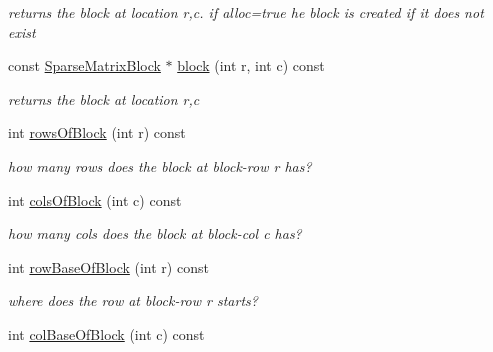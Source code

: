 \begin{DoxyCompactItemize}
\begin{DoxyCompactList}\small\item\em returns the block at location r,c. if alloc=true he block is created if it does not exist \end{DoxyCompactList}\item 
\hypertarget{classg2o_1_1SparseBlockMatrix_a1dd47246358ea852f8ff3db76aa6a287}{const \hyperlink{classg2o_1_1SparseBlockMatrix_ab2f7376cbf055803fda6527dcc43e3be}{Sparse\-Matrix\-Block} $\ast$ \hyperlink{classg2o_1_1SparseBlockMatrix_a1dd47246358ea852f8ff3db76aa6a287}{block} (int r, int c) const }\label{classg2o_1_1SparseBlockMatrix_a1dd47246358ea852f8ff3db76aa6a287}

\begin{DoxyCompactList}\small\item\em returns the block at location r,c \end{DoxyCompactList}\item 
\hypertarget{classg2o_1_1SparseBlockMatrix_a2f1eceae58978d7ee263a80961006d22}{int \hyperlink{classg2o_1_1SparseBlockMatrix_a2f1eceae58978d7ee263a80961006d22}{rows\-Of\-Block} (int r) const }\label{classg2o_1_1SparseBlockMatrix_a2f1eceae58978d7ee263a80961006d22}

\begin{DoxyCompactList}\small\item\em how many rows does the block at block-\/row r has? \end{DoxyCompactList}\item 
\hypertarget{classg2o_1_1SparseBlockMatrix_adb88ef292aedf1468f57cf5dc751a8e2}{int \hyperlink{classg2o_1_1SparseBlockMatrix_adb88ef292aedf1468f57cf5dc751a8e2}{cols\-Of\-Block} (int c) const }\label{classg2o_1_1SparseBlockMatrix_adb88ef292aedf1468f57cf5dc751a8e2}

\begin{DoxyCompactList}\small\item\em how many cols does the block at block-\/col c has? \end{DoxyCompactList}\item 
\hypertarget{classg2o_1_1SparseBlockMatrix_a176a2dbe00711e248ea25dc1995c6b4c}{int \hyperlink{classg2o_1_1SparseBlockMatrix_a176a2dbe00711e248ea25dc1995c6b4c}{row\-Base\-Of\-Block} (int r) const }\label{classg2o_1_1SparseBlockMatrix_a176a2dbe00711e248ea25dc1995c6b4c}

\begin{DoxyCompactList}\small\item\em where does the row at block-\/row r starts? \end{DoxyCompactList}\item 
\hypertarget{classg2o_1_1SparseBlockMatrix_adf282a20d7c77c5949a0d93ca2651271}{int \hyperlink{classg2o_1_1SparseBlockMatrix_adf282a20d7c77c5949a0d93ca2651271}{col\-Base\-Of\-Block} (int c) const }\label{classg2o_1_1SparseBlockMatrix_adf282a20d7c77c5949a0d93ca2651271}


\end{DoxyCompactItemize}
